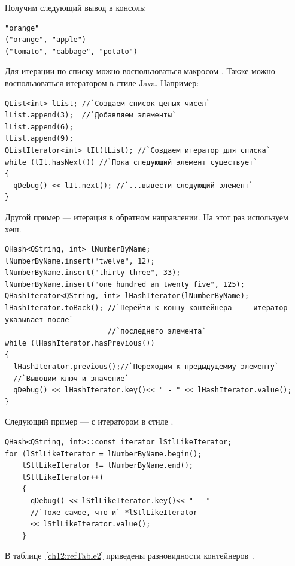 Получим следующий вывод в консоль:
\begin{verbatim}
"orange" 
("orange", "apple") 
("tomato", "cabbage", "potato")
\end{verbatim}

Для итерации по списку можно воспользоваться макросом
. Также можно
воспользоваться итератором в стиле Java. Например:
\begin{lstlisting}
QList<int> lList; //`Создаем список целых чисел`
lList.append(3);  //`Добавляем элементы`
lList.append(6);
lList.append(9);
QListIterator<int> lIt(lList); //`Создаем итератор для списка`
while (lIt.hasNext()) //`Пока следующий элемент существует`
{
  qDebug() << lIt.next(); //`...вывести следующий элемент`
}
\end{lstlisting}

Другой пример --- итерация в обратном направлении. На этот раз используем хеш.
\begin{lstlisting}
QHash<QString, int> lNumberByName;
lNumberByName.insert("twelve", 12);
lNumberByName.insert("thirty three", 33);
lNumberByName.insert("one hundred an twenty five", 125);
QHashIterator<QString, int> lHashIterator(lNumberByName);
lHashIterator.toBack(); //`Перейти к концу контейнера --- итератор указывает после` 
                        //`последнего элемента`
while (lHashIterator.hasPrevious())
{
  lHashIterator.previous();//`Переходим к предыдущемму элементу`
  //`Выводим ключ и значение`
  qDebug() << lHashIterator.key()<< " - " << lHashIterator.value();
}
\end{lstlisting}

Следующий пример  --- с итератором в стиле .
\begin{lstlisting}
QHash<QString, int>::const_iterator lStlLikeIterator;
for (lStlLikeIterator = lNumberByName.begin();
    lStlLikeIterator != lNumberByName.end();
    lStlLikeIterator++)
    {
      qDebug() << lStlLikeIterator.key()<< " - "
      //`Тоже самое, что и` *lStlLikeIterator
      << lStlLikeIterator.value();
    }
\end{lstlisting}

В таблице~\ref{ch12:refTable2} приведены разновидности контейнеров~. 

